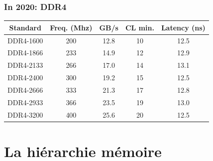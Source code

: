\documentclass[xcolor={x11names,svgnames}]{beamer}
\begin{document}
\begin{frame}
  \frametitle{In 2020: DDR4}

   
  \bigskip
  
  \small
  \begin{tabular}{|c|c|c|c|c|}
  \hline
Standard   & Freq. (Mhz) & GB/s  & CL min. & Latency (ns) \\
  \hline\hline                                                                    
DDR4-1600  & 200         & 12.8 & 10      & 12.5   \\
DDR4-1866  & 233         & 14.9 & 12      & 12.9 \\
DDR4-2133  & 266         & 17.0 & 14      & 13.1 \\
DDR4-2400  & 300         & 19.2 & 15      & 12.5   \\
DDR4-2666  & 333         & 21.3 & 17      & 12.8  \\
DDR4-2933  & 366         & 23.5 & 19      & 13.0  \\
DDR4-3200  & 400         & 25.6 & 20      & 12.5   \\
  \hline                                                                                            
\end{tabular}
\end{frame}


\section{La hiérarchie mémoire}

\end{document}
